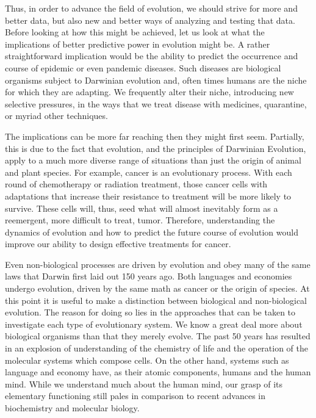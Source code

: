Thus, in order to advance the field of evolution, we should strive for more and better data, but also new and better ways of analyzing and testing that data. Before looking at how this might be achieved, let us look at what the implications of better predictive power in evolution might be. A rather straightforward implication would be the ability to predict the occurrence and course of epidemic or even pandemic diseases. Such diseases are biological organisms subject to Darwinian evolution and, often times humans are the niche for which they are adapting. We frequently alter their niche, introducing new selective pressures, in the ways that we treat disease with medicines, quarantine, or myriad other techniques.

The implications can be more far reaching then they might first seem. Partially, this is due to the fact that evolution, and the principles of Darwinian Evolution, apply to a much more diverse range of situations than just the origin of animal and plant species. For example, cancer is an evolutionary process. With each round of chemotherapy or radiation treatment, those cancer cells with adaptations that increase their resistance to treatment will be more likely to survive. These cells will, thus, seed what will almost inevitably form as a reemergent, more difficult to treat, tumor. Therefore, understanding the dynamics of evolution and how to predict the future course of evolution would improve our ability to design effective treatments for cancer.

Even non-biological processes are driven by evolution and obey many of the same laws that Darwin first laid out 150 years ago. Both languages and economies undergo evolution, driven by the same math as cancer or the origin of species. At this point it is useful to make a distinction between biological and non-biological evolution. The reason for doing so lies in the approaches that can be taken to investigate each type of evolutionary system. We know a great deal more about biological organisms than that they merely evolve. The past 50 years has resulted in an explosion of understanding of the chemistry of life and the operation of the molecular systems which compose cells. On the other hand, systems such as language and economy have, as their atomic components, humans and the human mind. While we understand much about the human mind, our grasp of its elementary functioning still pales in comparison to recent advances in biochemistry and molecular biology.

